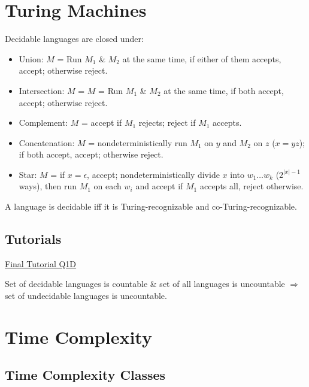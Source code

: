\documentclass[10pt,landscape,a4paper]{article}
\newcommand{\abs}[1]{\left | #1 \right |}
\begin{document}
\begin{multicols*}{3}
\section{Turing Machines}

Decidable languages are closed under:

\begin{itemize}
    \item Union: $M$ = Run $M_1$ \& $M_2$ at the same time, if either of them accepts, accept; otherwise reject.
    \item Intersection: $M$ = $M$ = Run $M_1$ \& $M_2$ at the same time, if both accept, accept; otherwise reject.
    \item Complement: $M$ = accept if $M_1$ rejects; reject if $M_1$ accepts.
    \item Concatenation: $M$ = nondeterministically run $M_1$ on $y$ and $M_2$ on $z$ ($x = yz$); if both accept, accept; otherwise reject.
    \item Star: $M$ = if $x = \epsilon$, accept; nondeterministically divide $x$ into $w_1\ldots w_k$ ($2^{\abs{x}-1}$ ways), then run $M_1$ on each $w_i$ and accept if $M_1$ accepts all, reject otherwise.
\end{itemize}

A language is decidable iff it is Turing-recognizable and co-Turing-recognizable.

\subsection{Tutorials}

\underline{Final Tutorial Q1D}

Set of decidable languages is countable \& set of all languages is uncountable $\Rightarrow$ set of undecidable languages is uncountable.

\section{Time Complexity}

\subsection{Time Complexity Classes}


\end{multicols*}
\end{document}

